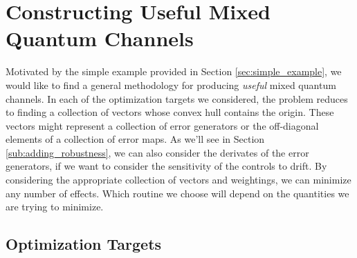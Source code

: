 \documentclass[aps,nofootinbib,pra,notitlepage,twocolumn]{revtex4-1}
\begin{document}
\section{Constructing Useful Mixed Quantum Channels}
\label{sec:mixed_unitary_processes}
Motivated by the simple example provided in Section \ref{sec:simple_example}, we would like to find a general methodology for producing \textit{useful} mixed quantum channels. In each of the optimization targets we considered, the problem reduces to finding a collection of vectors whose convex hull contains the origin. These vectors might represent a collection of error generators or the off-diagonal elements of a collection of error maps. As we'll see in Section \ref{sub:adding_robustness}, we can also consider the derivates of the error generators, if we want to consider the sensitivity of the controls to drift. By considering the appropriate collection of vectors and weightings, we can minimize any number of effects. Which routine we choose will depend on the quantities we are trying to minimize.

\subsection{Optimization Targets}
\end{document}
